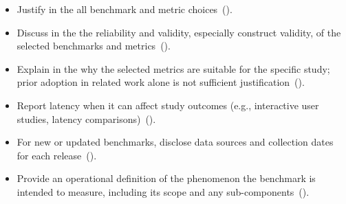 \begin{itemize}[label={},leftmargin=*]
    \item \iconM Justify in the \paper all benchmark and metric choices~().
    \item \iconM Discuss in the \paper the reliability and validity, especially construct validity, of the selected benchmarks and metrics~().
    \item \iconM Explain in the \paper why the selected metrics are suitable for the specific study; prior adoption in related work alone is not sufficient justification~().
    \item \iconM {} Report latency when it can affect study outcomes (e.g., interactive user studies, latency comparisons)~().
    \item \iconM {} For new or updated benchmarks, disclose data sources and collection dates for each release~().
    \item \iconS Provide an operational definition of the phenomenon the benchmark is intended to measure, including its scope and any sub-components~().

\end{itemize}
